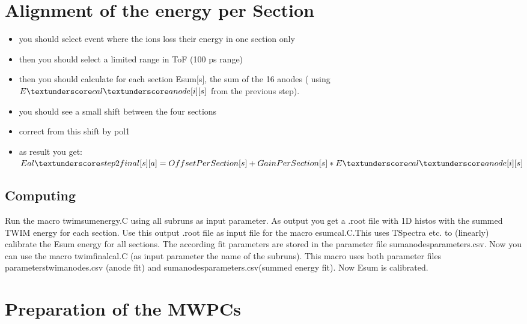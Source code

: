\documentclass{report}
\begin{document}
\section{Alignment of the energy per Section}
\begin{itemize}
	\item you should select event where the ions loss their energy in one section only
	\item then you should select a limited range in ToF (100 ps range)
	\item then you should calculate for each section Esum[s], the sum of the 16 anodes ( using $E\textunderscore cal\textunderscore anode[i][s]$ from the previous step). 
	\item you should see a small shift between the four sections
	\item correct from this shift by pol1
	\item as result you get: $Eal\textunderscore step2final[s][a] = OffsetPerSection[s] + GainPerSection[s] * E\textunderscore cal\textunderscore anode[i][s]$
\end{itemize}
\subsection{Computing}
Run the macro \dq twim\textunderscore sum\textunderscore energy.C\dq{} using all subruns as input parameter. As output you get a .root file with 1D histos with the summed TWIM energy for each section. Use this output .root file as input file for the macro \dq e\textunderscore sum\textunderscore cal.C\dq{}.This uses TSpectra etc. to (linearly) calibrate the E\textunderscore sum energy for all sections. The according fit parameters are stored in the parameter file \dq sum\textunderscore anodes\textunderscore parameters.csv\dq{}.\newline
Now you can use the macro \dq twim\textunderscore final\textunderscore cal.C\dq{} (as input parameter the name of the subruns). This macro uses both parameter files \dq parameters\textunderscore twim\textunderscore anodes.csv (anode fit) and \dq sum\textunderscore anodes\textunderscore parameters.csv\dq{}(summed energy fit). Now E\textunderscore sum is calibrated.



\section{Preparation of the MWPCs}
\end{document}
